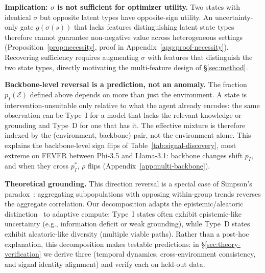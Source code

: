 
\textbf{Implication: $\sigma$ is not sufficient for optimizer utility.}
Two states with identical $\sigma$ but opposite latent types have opposite-sign utility. An uncertainty-only gate $g(\sigma(s))$ that lacks features distinguishing latent state types therefore cannot guarantee non-negative value across heterogeneous settings (Proposition~\ref{prop:necessity}, proof in Appendix~\ref{app:proof-necessity}). Recovering sufficiency requires augmenting $\sigma$ with features that distinguish the two state types, directly motivating the multi-feature design of \S\ref{sec:method}.

\textbf{Backbone-level reversal is a prediction, not an anomaly.}
The fraction $p_I(\mathcal{E})$ defined above depends on more than just the environment. A state is intervention-unsuitable only relative to what the agent already encodes: the same observation can be Type~I for a model that lacks the relevant knowledge or grounding and Type~D for one that has it. The effective mixture is therefore indexed by the (environment, backbone) pair, not the environment alone. This explains the backbone-level sign flips of Table~\ref{tab:signal-discovery}, most extreme on FEVER between Phi-3.5 and Llama-3.1: backbone changes shift $p_I$, and when they cross $p_I^*$, $\rho$ flips (Appendix~\ref{app:multi-backbone}).

\textbf{Theoretical grounding.}
This direction reversal is a special case of Simpson's paradox~\cite{simpson1951interpretation, DBLP:books/acm/22/Pearl22n}: aggregating subpopulations with opposing within-group trends reverses the aggregate correlation. Our decomposition adapts the epistemic/aleatoric distinction~\cite{der2009aleatory} to adaptive compute: Type~I states often exhibit epistemic-like uncertainty (e.g., information deficit or weak grounding), while Type~D states exhibit aleatoric-like diversity (multiple viable paths). Rather than a post-hoc explanation, this decomposition makes testable predictions: in \S\ref{sec:theory-verification} we derive three (temporal dynamics, cross-environment consistency, and signal identity alignment) and verify each on held-out data.
